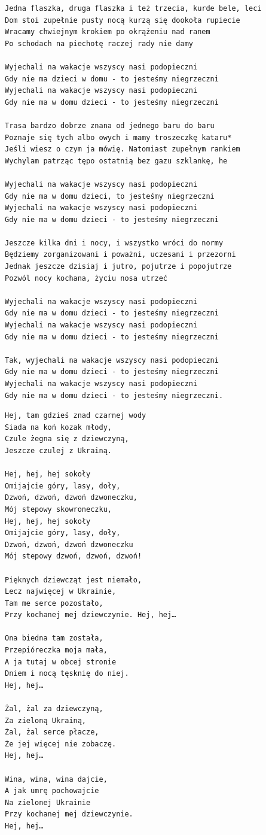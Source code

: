 \documentclass[12pt]{article}
\begin{document}
\begin{verbatim}
Jedna flaszka, druga flaszka i też trzecia, kurde bele, leci
Dom stoi zupełnie pusty nocą kurzą się dookoła rupiecie
Wracamy chwiejnym krokiem po okrążeniu nad ranem
Po schodach na piechotę raczej rady nie damy

Wyjechali na wakacje wszyscy nasi podopieczni
Gdy nie ma dzieci w domu - to jesteśmy niegrzeczni
Wyjechali na wakacje wszyscy nasi podopieczni
Gdy nie ma w domu dzieci - to jesteśmy niegrzeczni

Trasa bardzo dobrze znana od jednego baru do baru
Poznaje się tych albo owych i mamy troszeczkę kataru*
Jeśli wiesz o czym ja mówię. Natomiast zupełnym rankiem
Wychylam patrząc tępo ostatnią bez gazu szklankę, he

Wyjechali na wakacje wszyscy nasi podopieczni
Gdy nie ma w domu dzieci, to jesteśmy niegrzeczni
Wyjechali na wakacje wszyscy nasi podopieczni
Gdy nie ma w domu dzieci - to jesteśmy niegrzeczni

Jeszcze kilka dni i nocy, i wszystko wróci do normy
Będziemy zorganizowani i poważni, uczesani i przezorni
Jednak jeszcze dzisiaj i jutro, pojutrze i popojutrze
Pozwól nocy kochana, życiu nosa utrzeć

Wyjechali na wakacje wszyscy nasi podopieczni
Gdy nie ma w domu dzieci - to jesteśmy niegrzeczni
Wyjechali na wakacje wszyscy nasi podopieczni
Gdy nie ma w domu dzieci - to jesteśmy niegrzeczni

Tak, wyjechali na wakacje wszyscy nasi podopieczni
Gdy nie ma w domu dzieci - to jesteśmy niegrzeczni
Wyjechali na wakacje wszyscy nasi podopieczni
Gdy nie ma w domu dzieci - to jesteśmy niegrzeczni.
\end{verbatim}
\clearpage

\begin{verbatim}
Hej, tam gdzieś znad czarnej wody
Siada na koń kozak młody,
Czule żegna się z dziewczyną,
Jeszcze czulej z Ukrainą.

Hej, hej, hej sokoły
Omijajcie góry, lasy, doły,
Dzwoń, dzwoń, dzwoń dzwoneczku,
Mój stepowy skowroneczku,
Hej, hej, hej sokoły
Omijajcie góry, lasy, doły,
Dzwoń, dzwoń, dzwoń dzwoneczku
Mój stepowy dzwoń, dzwoń, dzwoń!

Pięknych dziewcząt jest niemało,
Lecz najwięcej w Ukrainie,
Tam me serce pozostało,
Przy kochanej mej dziewczynie. Hej, hej…

Ona biedna tam została,
Przepióreczka moja mała,
A ja tutaj w obcej stronie
Dniem i nocą tęsknię do niej.
Hej, hej…

Żal, żal za dziewczyną,
Za zieloną Ukrainą,
Żal, żal serce płacze,
Że jej więcej nie zobaczę.
Hej, hej…

Wina, wina, wina dajcie,
A jak umrę pochowajcie
Na zielonej Ukrainie
Przy kochanej mej dziewczynie.
Hej, hej…
\end{verbatim}
\clearpage
\end{document}
